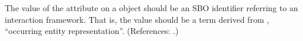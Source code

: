 The value of the attribute  on a \Reaction object should be
an SBO identifier referring to an interaction framework.  That is, the
value should be a term derived from \sbointeractionID, ``occurring entity representation''.
(References: .)
